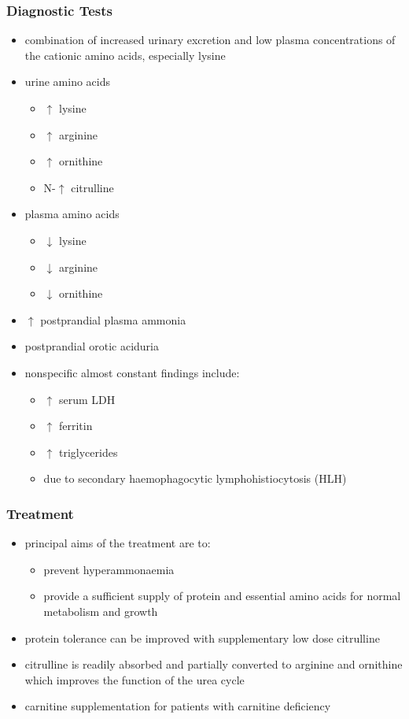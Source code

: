 \documentclass{scrartcl}
\begin{document}
\subsubsection{Diagnostic Tests}
\label{sec:org4d34534}
\begin{itemize}
\item combination of increased urinary excretion and low plasma
concentrations of the cationic amino acids, especially lysine
\item urine amino acids
\begin{itemize}
\item \(\uparrow\) lysine
\item \(\uparrow\) arginine
\item \(\uparrow\) ornithine
\item N-\(\uparrow\) citrulline
\end{itemize}
\item plasma amino acids
\begin{itemize}
\item \(\downarrow\) lysine
\item \(\downarrow\) arginine
\item \(\downarrow\) ornithine
\end{itemize}
\item \(\uparrow\) postprandial plasma ammonia
\item postprandial orotic aciduria
\item nonspecific almost constant findings include:
\begin{itemize}
\item \(\uparrow\) serum LDH
\item \(\uparrow\) ferritin
\item \(\uparrow\) triglycerides
\item due to secondary haemophagocytic lymphohistiocytosis (HLH)
\end{itemize}
\end{itemize}

\subsubsection{Treatment}
\label{sec:org837a3b7}
\begin{itemize}
\item principal aims of the treatment are to:
\begin{itemize}
\item prevent hyperammonaemia
\item provide a sufficient supply of protein and essential amino acids
for normal metabolism and growth
\end{itemize}

\item protein tolerance can be improved with supplementary low dose
citrulline
\item citrulline is readily absorbed and partially converted to arginine
and ornithine which improves the function of the urea cycle
\item carnitine supplementation for patients with carnitine deficiency
\end{itemize}
\end{document}
